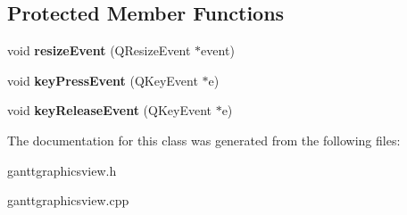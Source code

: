 \subsection*{Protected Member Functions}
\begin{DoxyCompactItemize}
\item 
\hypertarget{class_gantt_graphics_view_a839f61e2646f059eb29c7b3a1e6ca15e}{}void {\bfseries resize\+Event} (Q\+Resize\+Event $\ast$event)\label{class_gantt_graphics_view_a839f61e2646f059eb29c7b3a1e6ca15e}

\item 
\hypertarget{class_gantt_graphics_view_a31beb77537b5418c5f6dea00908b4f3b}{}void {\bfseries key\+Press\+Event} (Q\+Key\+Event $\ast$e)\label{class_gantt_graphics_view_a31beb77537b5418c5f6dea00908b4f3b}

\item 
\hypertarget{class_gantt_graphics_view_a4f89078a1ee9352fe08118664a9bfca1}{}void {\bfseries key\+Release\+Event} (Q\+Key\+Event $\ast$e)\label{class_gantt_graphics_view_a4f89078a1ee9352fe08118664a9bfca1}

\end{DoxyCompactItemize}


The documentation for this class was generated from the following files\+:\begin{DoxyCompactItemize}
\item 
ganttgraphicsview.\+h\item 
ganttgraphicsview.\+cpp\end{DoxyCompactItemize}

